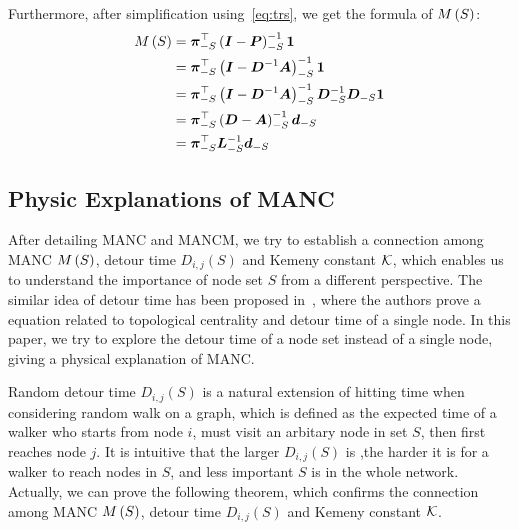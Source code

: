 \documentclass[sigconf]{acmart}
\begin{document}
Furthermore, after simplification using~\eqref{eq:trs}, we get the formula of \(M\left(S\right)\):
\begin{equation}\label{eq:MANC}
    \begin{split}
        M\left(S\right) & =\boldsymbol{\pi}_{-S}^\top\left( \boldsymbol{I}-\boldsymbol{P} \right)_{-S}^{-1}\boldsymbol{1}                                    \\
        & =\boldsymbol{\pi}_{-S}^\top\left( \boldsymbol{I}-\boldsymbol{D}^{-1}\boldsymbol{A} \right)_{-S}^{-1}\boldsymbol{1}                          \\
        & =\boldsymbol{\pi}_{-S}^\top\left( \boldsymbol{I}-\boldsymbol{D}^{-1}\boldsymbol{A} \right)_{-S}^{-1}\boldsymbol{D}_{-S}^{-1}\boldsymbol{D}_{-S}\boldsymbol{1} \\
        & =\boldsymbol{\pi}_{-S}^\top\left( \boldsymbol{D}-\boldsymbol{A} \right)_{-S}^{-1}\boldsymbol{d}_{-S}                                \\
        & =\boldsymbol{\pi}_{-S}^\top\boldsymbol{L}_{-S}^{-1}\boldsymbol{d}_{-S}
    \end{split}
\end{equation}

\subsection{Physic Explanations of MANC}

After detailing MANC and MANCM, we try to establish a connection among MANC \(M\left(S\right)\), detour time \(D_{i,j}(S)\) and Kemeny constant \(\mathcal{K}\), which enables us to understand the importance of node set \(S\) from a different perspective. The similar idea of detour time has been proposed in~\cite{RaGyZh13}, where the authors prove a equation related to topological centrality and detour time of a single node. In this paper, we try to explore the detour time of a node set instead of a single node, giving a physical explanation of MANC.

Random detour time \(D_{i,j}(S)\) is a natural extension of hitting time when considering random walk on a graph, which is defined as the expected time of a walker who starts from node \(i\), must visit an arbitary node in set \(S\), then first reaches node \(j\). It is intuitive that the larger \(D_{i,j}(S)\) is ,the harder it is for a walker to reach nodes in \(S\), and less important \(S\) is in the whole network. Actually, we can prove the following theorem, which confirms the connection among MANC \(M\left(S\right)\), detour time \(D_{i,j}(S)\) and Kemeny constant \(\mathcal{K}\).
\end{document}
